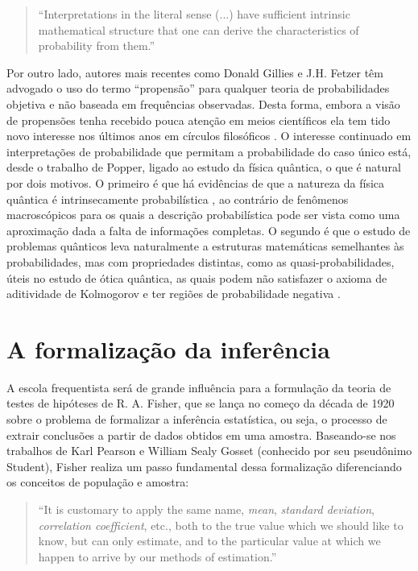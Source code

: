 \begin{quote}
``Interpretations in the literal sense (...) have sufficient intrinsic mathematical structure that one can derive
the characteristics of probability from them.''\citep{Milne93}
\end{quote}

Por outro lado, autores mais recentes como Donald Gillies e J.H. Fetzer têm advogado o uso do termo ``propensão'' para
qualquer teoria de probabilidades objetiva e não baseada em frequências observadas.
Desta forma, embora a visão de propensões tenha recebido pouca atenção em meios científicos
ela tem tido novo interesse nos últimos anos em círculos filosóficos \citep{Gillies2000}. 
O interesse continuado em interpretações de probabilidade que permitam a probabilidade do caso único
está, desde o trabalho de Popper, ligado ao estudo da física quântica, o que é natural por dois motivos.
O primeiro é que há evidências de que a natureza da física quântica é intrinsecamente probabilística \citep{Gudder88}, 
ao contrário de fenômenos
macroscópicos para os quais a descrição probabilística pode ser vista como uma aproximação dada a falta de informações completas.
O segundo é que o estudo de problemas quânticos leva naturalmente a estruturas matemáticas semelhantes às probabilidades, mas
com propriedades distintas, como as quasi-probabilidades, úteis no estudo de ótica quântica, as quais podem não satisfazer o
axioma de aditividade de Kolmogorov e ter regiões de probabilidade
negativa \citep{Mandel95}.

\section{A formalização da inferência}\label{sec:infer}

A escola frequentista será de grande influência para a formulação da teoria de testes de hipóteses de R. A. Fisher, que se
lança no começo da década de 1920 sobre o problema de formalizar a inferência estatística, ou seja, o processo de
extrair conclusões a partir de dados obtidos em uma amostra. Baseando-se nos trabalhos de Karl Pearson e William Sealy Gosset
(conhecido por seu pseudônimo Student), Fisher realiza um passo fundamental dessa formalização
diferenciando os conceitos de população e amostra:

\begin{quote}
``It is customary to apply the same name, {\em mean}, {\em standard deviation}, {\em correlation coefficient}, etc., both 
to the true value which we should like to know, but can only estimate, and to the particular value at which we happen 
to arrive by our methods of estimation.''\citep{Fisher1922}
\end{quote}

